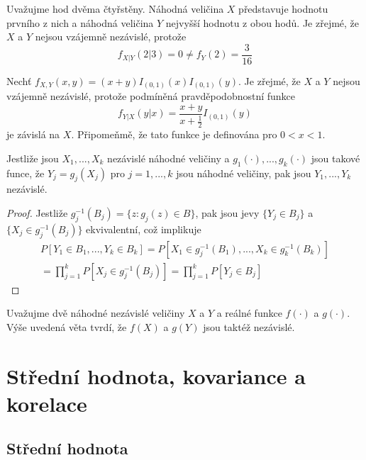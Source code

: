 \begin{example}
Uvažujme hod dvěma čtyřstěny. Náhodná veličina $X$ představuje hodnotu prvního z nich a náhodná veličina $Y$ nejvyšší hodnotu z obou hodů. Je zřejmé, že $X$ a $Y$ nejsou vzájemně nezávislé, protože
\begin{equation*}
f_{X|Y}(2|3) = 0 \not= f_Y(2) = \frac{3}{16}
\end{equation*}
\end{example}

\begin{example}
Nechť $f_{X,Y}(x,y) = (x + y)I_{(0, 1)}(x)I_{(0, 1)}(y)$. Je zřejmé, že $X$ a $Y$ nejsou vzájemně nezávislé, protože podmíněná pravděpodobnostní funkce
\begin{equation*}
f_{Y|X}(y|x) = \frac{x + y}{x + \frac{1}{2}}I_{(0,1)}(y)
\end{equation*}
je závislá na $X$. Připomeňmě, že tato funkce je definována pro $0 < x < 1$.
\end{example}

\begin{theorem}
Jestliže jsou $X_1, ..., X_k$ nezávislé náhodné veličiny a $g_1(\cdot), ..., g_k(\cdot)$ jsou takové funce, že $Y_j = g_j(X_j)$ pro $j = 1, ..., k$ jsou náhodné veličiny, pak jsou $Y_1, ..., Y_k$ nezávislé.
\end{theorem}

\begin{proof}
Jestliže $g_j^{-1}(B_j) = \{z: g_j(z) \in B \}$, pak jsou jevy $\{Y_j \in B_j \}$ a $\{ X_j \in g_j^{-1}(B_j) \}$ ekvivalentní, což implikuje
\begin{gather*}
P[Y_1 \in B_1, ..., Y_k \in B_k] = P[X_1 \in g_j^{-1}(B_1), ..., X_k \in g_k^{-1}(B_k)]\\
= \prod_{j = 1}^k P[X_j \in g_j^{-1}(B_j)] = \prod_{j = 1}^k P[Y_j \in B_j]
\end{gather*}
\end{proof}

Uvažujme dvě náhodné nezávislé veličiny $X$ a $Y$ a reálné funkce $f(\cdot)$ a $g(\cdot)$. Výše uvedená věta tvrdí, že $f(X)$ a $g(Y)$ jsou taktéž nezávislé.

\section{Střední hodnota, kovariance a korelace}

\subsection{Střední hodnota}

